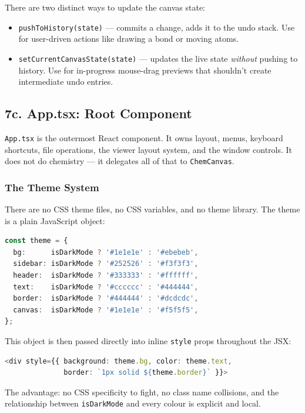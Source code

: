 \documentclass[11pt,a4paper]{article}
\begin{document}
There are two distinct ways to update the canvas state:
\begin{itemize}[leftmargin=1.5em]
  \item \lstinline|pushToHistory(state)| --- commits a change, adds it to the undo
        stack. Use for user-driven actions like drawing a bond or moving atoms.
  \item \lstinline|setCurrentCanvasState(state)| --- updates the live state
        \textit{without} pushing to history. Use for in-progress mouse-drag previews
        that shouldn't create intermediate undo entries.
\end{itemize}

\subsection{7c. App.tsx: Root Component}

\lstinline|App.tsx| is the outermost React component. It owns layout, menus, keyboard
shortcuts, file operations, the viewer layout system, and the window controls. It does
not do chemistry --- it delegates all of that to \lstinline|ChemCanvas|.

\subsubsection{The Theme System}

There are no CSS theme files, no CSS variables, and no theme library. The theme is a
plain JavaScript object:

\begin{lstlisting}[language=TypeScript]
const theme = {
  bg:      isDarkMode ? '#1e1e1e' : '#ebebeb',
  sidebar: isDarkMode ? '#252526' : '#f3f3f3',
  header:  isDarkMode ? '#333333' : '#ffffff',
  text:    isDarkMode ? '#cccccc' : '#444444',
  border:  isDarkMode ? '#444444' : '#dcdcdc',
  canvas:  isDarkMode ? '#1e1e1e' : '#f5f5f5',
};
\end{lstlisting}

This object is then passed directly into inline \lstinline|style| props throughout the
JSX:
\begin{lstlisting}[language=TypeScript]
<div style={{ background: theme.bg, color: theme.text,
              border: `1px solid ${theme.border}` }}>
\end{lstlisting}

The advantage: no CSS specificity to fight, no class name collisions, and the
relationship between \lstinline|isDarkMode| and every colour is explicit and local.
\end{document}
